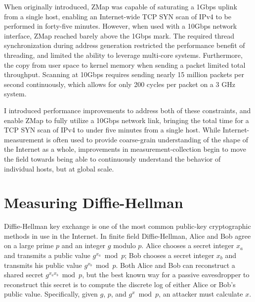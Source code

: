 When originally introduced, ZMap was capable of saturating a 1Gbps uplink from
a single host, enabling an Internet-wide TCP SYN scan of IPv4 to be performed
in forty-five minutes. However, when used with a 10Gbps network interface, ZMap
reached barely above the 1Gbps mark. The required thread synchronization during
address generation restricted the performance benefit of threading, and limited
the ability to leverage multi-core systems. Furthermore, the copy from user
space to kernel memory when sending a packet limited total throughput.
Scanning at 10Gbps requires sending nearly 15 million packets per second
continuously, which allows for only 200 cycles per packet on a 3 GHz system.

I introduced performance improvements to address both of these constraints, and
enable ZMap to fully utilize a 10Gbps network link, bringing the total time for
a TCP SYN scan of IPv4 to under five minutes from a single host. While
Internet-measurement is often used to provide coarse-grain understanding of the
shape of the Internet as a whole, improvements in measurement-collection begin
to move the field towards being able to continuously understand the behavior of
individual hosts, but at global scale.

\section{Measuring Diffie-Hellman}

Diffie-Hellman key exchange is one of the most common public-key
cryptographic methods in use in the Internet. In finite field Diffie-Hellman,
Alice and Bob agree on a large prime $p$ and an integer $g$ modulo $p$. Alice
chooses a secret integer $x_a$ and transmits a public value $g^{x_a} \bmod
p$; Bob chooses a secret integer $x_b$ and transmits his public value
$g^{x_b} \bmod p$. Both Alice and Bob can reconstruct a shared secret $g^{x_a
x_b} \bmod p$, but the best known way for a passive eavesdropper to
reconstruct this secret is to compute the discrete log of either Alice or
Bob's public value. Specifically, given $g$, $p$, and $g^x \bmod p$, an
attacker must calculate $x$.

